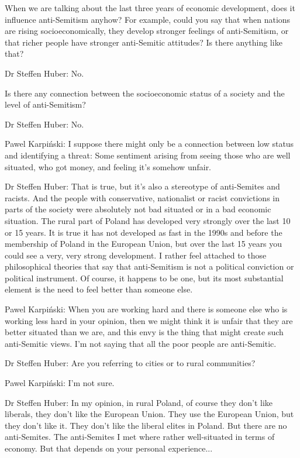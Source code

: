  

 When we are talking about the last three years of economic development, does it influence anti-Semitism anyhow?  For example, could you say that when nations are rising socioeconomically, they develop stronger feelings of anti-Semitism, or that richer people have stronger anti-Semitic attitudes? Is there anything like that? 

 

Dr Steffen Huber: No. 

 

 Is there any connection between the socioeconomic status of a society and the level of anti-Semitism? 

 

Dr Steffen Huber: No. 

Pawel Karpiński: I suppose there might only be a connection between low status and identifying a threat: Some sentiment arising from seeing those who are well situated, who got money, and feeling it's somehow unfair.  

Dr Steffen Huber: That is true, but it's also a stereotype of anti-Semites and racists. And the people with conservative, nationalist or racist convictions in parts of the society were absolutely not bad situated or in a bad economic situation. The rural part of Poland has developed very strongly over the last 10 or 15 years. It is true it has not developed as fast in the 1990s and before the membership of Poland in the European Union, but over the last 15 years you could see a very, very strong development. I rather feel attached to those philosophical theories that say that anti-Semitism is not a political conviction or political instrument. Of course, it happens to be one, but its most substantial element is the need to feel better than someone else.  

Pawel Karpiński: When you are working hard and there is someone else who is working less hard in your opinion, then we might think it is unfair that they are better situated than we are, and this envy is the thing that might create such anti-Semitic views. I’m not saying that all the poor people are anti-Semitic.  

Dr Steffen Huber:  Are you referring to cities or to rural communities? 

Pawel Karpiński: I'm not sure. 

Dr Steffen Huber: In my opinion, in rural Poland, of course they don't like liberals, they don't like the European Union. They use the European Union, but they don't like it. They don't like the liberal elites in Poland. But there are no anti-Semites. The anti-Semites I met where rather well-situated in terms of economy. But that depends on your personal experience... 

